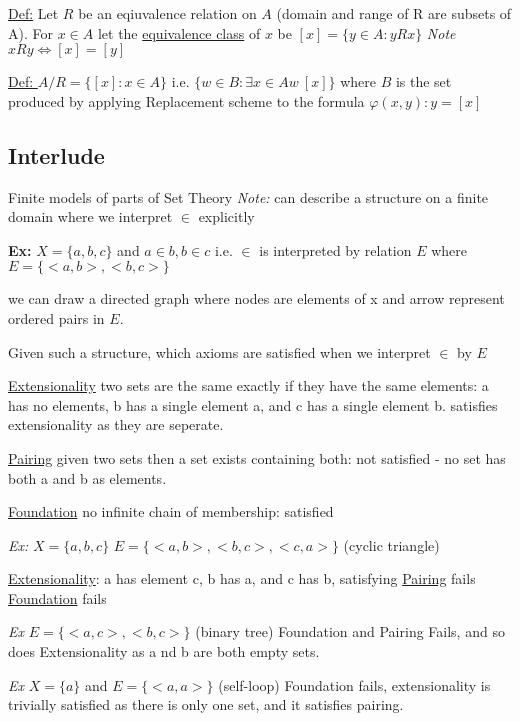 \documentclass{article}
\begin{document}
    \underline{Def:} Let $R$ be an eqiuvalence relation on $A$ (domain and range of R are subsets of A).
    For $x \in A$ let the \underline{equivalence class} of $x$ be $[x] = \{y \in A : y R x\}$
    \emph{Note } $x R y \iff [x] = [y]$

    \underline{Def: } $A/R = \{[x] : x \in A\}$
    i.e. $\{w \in B : \exists x \in A w \ [x]\}$
    where $B$ is the set produced by applying Replacement scheme to the formula $\varphi(x,y) : y=[x]$

    \subsection{Interlude}
    Finite models of parts of Set Theory
    \emph{Note:} can describe a structure on a finite domain where we interpret $\in$ explicitly

    \textbf{Ex:} $X = \{a,b,c\}$ and $a \in b, b \in c$
    i.e. $\in$ is interpreted by relation $E$ where $E = \{ <a,b> , <b,c>\}$

    we can draw a directed graph where nodes are elements of x and arrow represent ordered pairs in $E$.

    Given such a structure, which axioms are satisfied when we interpret $\in$ by $E$

    \underline{Extensionality} two sets are the same exactly if they have the same elements:
    a has no elements, b has a single element a, and c has a single element b.
    satisfies extensionality as they are seperate.

    \underline{Pairing} given two sets then a set exists containing both:
    not satisfied - no set has both a and b as elements.

    \underline{Foundation} no infinite chain of membership:
    satisfied

    \emph{Ex:} $X = \{a,b,c\}$
    $E = \{<a,b>,<b,c>,<c,a>\}$
    (cyclic triangle)

    \underline{Extensionality}: a has element c, b has a, and c has b, satisfying
    \underline{Pairing} fails
    \underline{Foundation} fails

    \emph{Ex} $E =\{<a,c>,<b,c>\}$ (binary tree)
    Foundation and Pairing Fails, and so does Extensionality as a nd b are both empty sets.

    \emph{Ex} $X=\{a\}$ and $E=\{<a,a>\}$ (self-loop)
    Foundation fails, extensionality is trivially satisfied as there is only one set, and it satisfies pairing.
\end{document}
